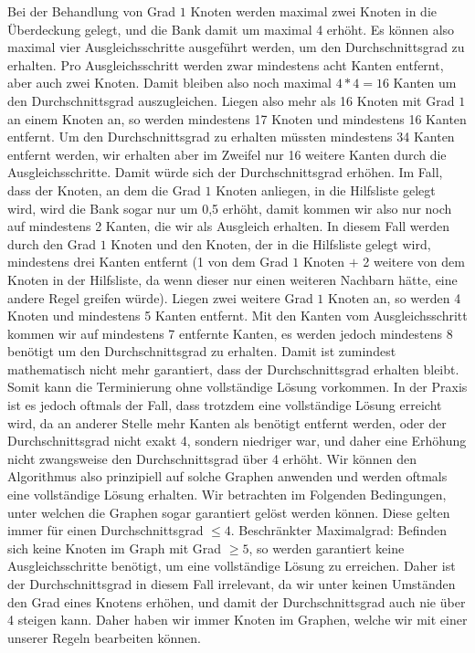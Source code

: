 \documentclass[12pt,onecolumn, notitlepage]{scrartcl}
\begin{document}
Bei der Behandlung von Grad $1$ Knoten werden maximal zwei Knoten in die Überdeckung gelegt, und die Bank damit um maximal 4 erhöht. Es können also maximal vier Ausgleichsschritte ausgeführt werden, um den Durchschnittsgrad zu erhalten. Pro Ausgleichsschritt werden zwar mindestens acht Kanten entfernt, aber auch zwei Knoten. Damit bleiben also noch maximal $4 * 4 = 16$ Kanten um den Durchschnittsgrad auszugleichen. Liegen also mehr als 16 Knoten mit Grad $1$ an einem Knoten an, so werden mindestens 17 Knoten und mindestens 16 Kanten entfernt. Um den Durchschnittsgrad zu erhalten müssten mindestens 34 Kanten entfernt werden, wir erhalten aber im Zweifel nur 16 weitere Kanten durch die Ausgleichsschritte. Damit würde sich der Durchschnittsgrad erhöhen. Im Fall, dass der Knoten, an dem die Grad $1$ Knoten anliegen, in die Hilfsliste gelegt wird, wird die Bank sogar nur um 0,5 erhöht, damit kommen wir also nur noch auf mindestens 2 Kanten, die wir als Ausgleich erhalten. In diesem Fall werden durch den Grad $1$ Knoten und den Knoten, der in die Hilfsliste gelegt wird, mindestens drei Kanten entfernt (1 von dem Grad $1$ Knoten $+$ 2 weitere von dem Knoten in der Hilfsliste, da wenn dieser nur einen weiteren Nachbarn hätte, eine andere Regel greifen würde). Liegen zwei weitere Grad $1$ Knoten an, so werden 4 Knoten und mindestens 5 Kanten entfernt. Mit den Kanten vom Ausgleichsschritt kommen wir auf mindestens 7 entfernte Kanten, es werden jedoch mindestens 8 benötigt um den Durchschnittsgrad zu erhalten. \newline
Damit ist zumindest mathematisch nicht mehr garantiert, dass der Durchschnittsgrad erhalten bleibt. Somit kann die Terminierung ohne vollständige Lösung vorkommen. In der Praxis ist es jedoch oftmals der Fall, dass trotzdem eine vollständige Lösung erreicht wird, da an anderer Stelle mehr Kanten als benötigt entfernt werden, oder der Durchschnittsgrad nicht exakt 4, sondern niedriger war, und daher eine Erhöhung nicht zwangsweise den Durchschnittsgrad über 4 erhöht. \newline
Wir können den Algorithmus also prinzipiell auf solche Graphen anwenden und werden oftmals eine vollständige Lösung erhalten. Wir betrachten im Folgenden Bedingungen, unter welchen die Graphen sogar garantiert gelöst werden können. Diese gelten immer für einen Durchschnittsgrad $\leq 4$.  \newline
Beschränkter Maximalgrad:\newline
Befinden sich keine Knoten im Graph mit Grad $\geq 5$, so werden garantiert keine Ausgleichsschritte benötigt, um eine vollständige Lösung zu erreichen. Daher ist der Durchschnittsgrad in diesem Fall irrelevant, da wir unter keinen Umständen den Grad eines Knotens erhöhen, und damit der Durchschnittsgrad auch nie über 4 steigen kann. Daher haben wir immer Knoten im Graphen, welche wir mit einer unserer Regeln bearbeiten können.\newline\newline
\end{document}
